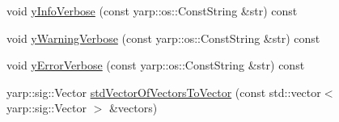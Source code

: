 \begin{DoxyCompactItemize}
\item 
void \hyperlink{classVisualServoingServer_a6b16f76335ebbd9e4ba9e5ddb67cf883}{y\+Info\+Verbose} (const yarp\+::os\+::\+Const\+String \&str) const
\item 
void \hyperlink{classVisualServoingServer_a570985820c386689a9507066a016b839}{y\+Warning\+Verbose} (const yarp\+::os\+::\+Const\+String \&str) const
\item 
void \hyperlink{classVisualServoingServer_a8eb3cf6c73a515f6f435f01327d37bd1}{y\+Error\+Verbose} (const yarp\+::os\+::\+Const\+String \&str) const
\item 
yarp\+::sig\+::\+Vector \hyperlink{classVisualServoingServer_adcc6db0a6cf857c4bd44d495ec445954}{std\+Vector\+Of\+Vectors\+To\+Vector} (const std\+::vector$<$ yarp\+::sig\+::\+Vector $>$ \&vectors)
\end{DoxyCompactItemize}

